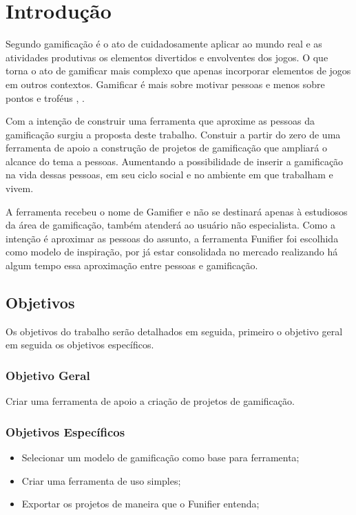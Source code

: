 \chapter[Introdução]{Introdução}


Segundo \cite{chou2015actionable} gamificação é o ato de cuidadosamente aplicar ao mundo real e as atividades produtivas os elementos divertidos e envolventes dos jogos. O que torna o ato de gamificar mais complexo que apenas incorporar elementos de jogos em outros contextos. Gamificar é mais sobre  motivar pessoas e menos sobre pontos e troféus \cite{chou2015actionable}, \cite{zichermann2011gamification}. 

Com a intenção de construir uma ferramenta que aproxime as pessoas da gamificação surgiu a proposta deste trabalho. Constuir a partir do zero de uma ferramenta de apoio a construção de projetos de gamificação que ampliará o alcance do tema a pessoas. Aumentando a possibilidade de inserir a gamificação na vida dessas pessoas, em seu ciclo social e no ambiente em que trabalham e vivem.

A ferramenta recebeu o nome de Gamifier e não se destinará apenas à estudiosos da área de gamificação, também atenderá ao usuário não especialista. Como a intenção é aproximar as pessoas do assunto, a ferramenta Funifier foi escolhida como modelo de inspiração, por já estar consolidada no mercado realizando há algum tempo essa aproximação entre pessoas e gamificação. 


\section{Objetivos}

Os objetivos do trabalho serão detalhados em seguida, primeiro o objetivo geral em seguida os objetivos específicos.


\subsection{Objetivo Geral}

Criar uma ferramenta de apoio a criação de projetos de gamificação.

\subsection{Objetivos Específicos}

\begin{itemize}

\item  Selecionar um modelo de gamificação como base para ferramenta;
\item  Criar uma ferramenta de uso simples;
\item  Exportar os projetos de maneira que o Funifier entenda;


\end{itemize}


